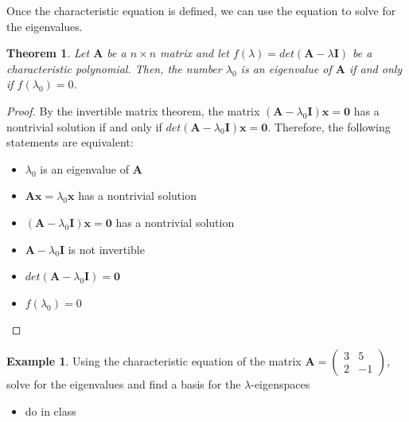 \documentclass[
]{book}
\providecommand{\tightlist}{%
  \setlength{\itemsep}{0pt}\setlength{\parskip}{0pt}}
\newtheorem{theorem}{Theorem}[chapter]
\theoremstyle{definition}
\theoremstyle{definition}
\newtheorem{example}{Example}[chapter]
\theoremstyle{definition}
\theoremstyle{definition}
\theoremstyle{remark}
\begin{document}
Once the characteristic equation is defined, we can use the equation to solve for the eigenvalues.

\begin{theorem}
Let \(\mathbf{A}\) be a \(n \times n\) matrix and let \(f(\lambda) = det(\mathbf{A} - \lambda \mathbf{I})\) be a characteristic polynomial. Then, the number \(\lambda_0\) is an eigenvalue of \(\mathbf{A}\) if and only if \(f(\lambda_0) = 0\).
\end{theorem}

\begin{proof}

By the invertible matrix theorem, the matrix \((\mathbf{A} - \lambda_0 \mathbf{I}) \mathbf{x} = \mathbf{0}\) has a nontrivial solution if and only if \(det(\mathbf{A} - \lambda_0 \mathbf{I}) \mathbf{x} = \mathbf{0}\). Therefore, the following statements are equivalent:

\begin{itemize}
\item
  \(\lambda_0\) is an eigenvalue of \(\mathbf{A}\)
\item
  \(\mathbf{A} \mathbf{x} = \lambda_0 \mathbf{x}\) has a nontrivial solution
\item
  \((\mathbf{A} - \lambda_0 \mathbf{I}) \mathbf{x} = \mathbf{0}\) has a nontrivial solution
\item
  \(\mathbf{A} - \lambda_0 \mathbf{I}\) is not invertible
\item
  \(det(\mathbf{A} - \lambda_0 \mathbf{I}) = \mathbf{0}\)
\item
  \(f(\lambda_0) = 0\)
\end{itemize}

\end{proof}

\begin{example}

Using the characteristic equation of the matrix \(\mathbf{A} = \begin{pmatrix} 3 & 5 \\ 2 & -1 \end{pmatrix}\), solve for the eigenvalues and find a basis for the \(\lambda\)-eigenspaces

\begin{itemize}
\tightlist
\item
  do in class
\end{itemize}

\end{example}
\end{document}

